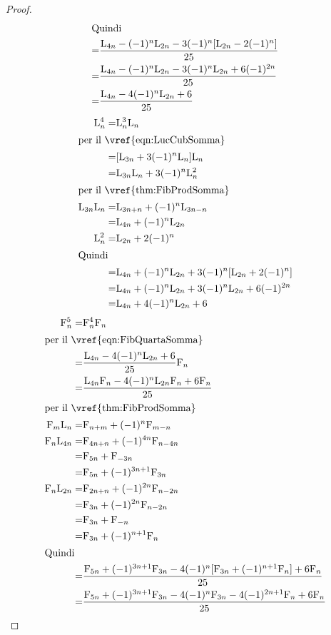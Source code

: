 \begin{proof}
\begin{align*}
\intertext{Quindi}
=&{}\dfrac{\mathrm{L}_{4n}-(-1)^n\mathrm{L}_{2n}-3(-1)^n[\mathrm{L}_{2n}-2(-1)^n]}{25}\\
=&{}\dfrac{\mathrm{L}_{4n}-(-1)^n\mathrm{L}_{2n}-3(-1)^n\mathrm{L}_{2n}+6(-1)^{2n}}{25}\\
=&{}\dfrac{\mathrm{L}_{4n}-4(-1)^n\mathrm{L}_{2n}+6}{25}\\
\end{align*}
\begin{align*}
\Luc{n}^4=&{}\Luc{n}^3\Luc{n}\\
\intertext{per il~\vref{eqn:LucCubSomma}}
=&{}[\Luc{3n}+3(-1)^n\Luc{n}]\Luc{n}\\
=&{}\Luc{3n}\Luc{n}+3(-1)^n\Luc{n}^2\\
\intertext{per il~\vref{thm:FibProdSomma}}
\Luc{3n}\Luc{n}=&{}\Luc{3n+n}+(-1)^n\Luc{3n-n}\\
=&{}\Luc{4n}+(-1)^n\Luc{2n}\\
\Luc{n}^2=&{}\Luc{2n}+2(-1)^n\\
\intertext{Quindi}
=&{}\Luc{4n}+(-1)^n\Luc{2n}+3(-1)^n[\Luc{2n}+2(-1)^n]\\
=&{}\Luc{4n}+(-1)^n\Luc{2n}+3(-1)^n\Luc{2n}+6(-1)^{2n}\\
=&{}\Luc{4n}+4(-1)^n\Luc{2n}+6\\
\end{align*}
\begin{align*}
	\Fib{n}^5=&{}\Fib{n}^4\Fib{n}\\
	\intertext{per il~\vref{eqn:FibQuartaSomma}}
	=&{}\dfrac{\Luc{4n}-4(-1)^n\Luc{2n}+6}{25}\Fib{n}\\
	=&{}\dfrac{\Luc{4n}\Fib{n}-4(-1)^n\Luc{2n}\Fib{n}+6\Fib{n}}{25}\\
	\intertext{per il~\vref{thm:FibProdSomma}}
	\Fib{m}\Luc{n}=&{}\Fib{n+m}+(-1)^n\Fib{m-n}\\
	\Fib{n}\Luc{4n}=&{}\Fib{4n+n}+(-1)^{4n}\Fib{n-4n}\\
	=&{}\Fib{5n}+\Fib{-3n}\\
	=&{}\Fib{5n}+(-1)^{3n+1}\Fib{3n}\\
	\Fib{n}\Luc{2n}=&{}\Fib{2n+n}+(-1)^{2n}\Fib{n-2n}\\
	=&{}\Fib{3n}+(-1)^{2n}\Fib{n-2n}\\
	=&{}\Fib{3n}+\Fib{-n}\\
	=&{}\Fib{3n}+(-1)^{n+1}\Fib{n}\\
	\intertext{Quindi}
	=&{}\dfrac{\Fib{5n}+(-1)^{3n+1}\Fib{3n}-4(-1)^n[\Fib{3n}+(-1)^{n+1}\Fib{n}]+6\Fib{n}}{25}\\
	=&{}\dfrac{\Fib{5n}+(-1)^{3n+1}\Fib{3n}-4(-1)^n\Fib{3n}-4(-1)^{2n+1}\Fib{n}+6\Fib{n}}{25}\\

\end{align*}
\end{proof}
